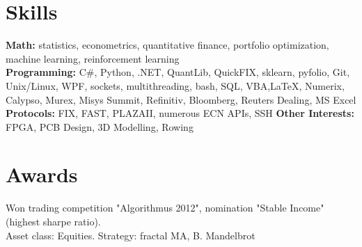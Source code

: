 \documentclass[letterpaper,hidelinks]{article}
\newcommand{\resumeSubHeadingListStart}{\begin{itemize}[leftmargin=0.1in, label={}]}
\newcommand{\resumeSubHeadingListEnd}{\end{itemize}}
\begin{document}
\vspace{-11pt}
\section{Skills}
\resumeSubHeadingListStart
\small{\item{
              \textbf{{Math:}}{ statistics, econometrics, quantitative finance, portfolio optimization, machine learning, reinforcement learning\\} %
              \textbf{{Programming:}}{ C\#, Python, .NET, QuantLib, QuickFIX, sklearn, pyfolio, Git, Unix/Linux, WPF, sockets, multithreading, bash, SQL, VBA,\LaTeX, Numerix, Calypso, Murex, Misys Summit, Refinitiv, Bloomberg, Reuters Dealing, MS Excel \\} %
              \textbf{{Protocols:}}{ FIX, FAST, PLAZAII, numerous ECN APIs, SSH } %
              \textbf{{Other Interests:}}{ FPGA, PCB Design, 3D Modelling, Rowing} %
        }}

\resumeSubHeadingListEnd
\vspace{-12pt}
\section{Awards}
\begin{description}%
  \item{Won trading competition "Algorithmus 2012", nomination "Stable Income" (highest sharpe ratio). \\Asset class: Equities. Strategy: fractal MA, B. Mandelbrot}  
\vspace{-5pt}
\end{description}
\end{document}
